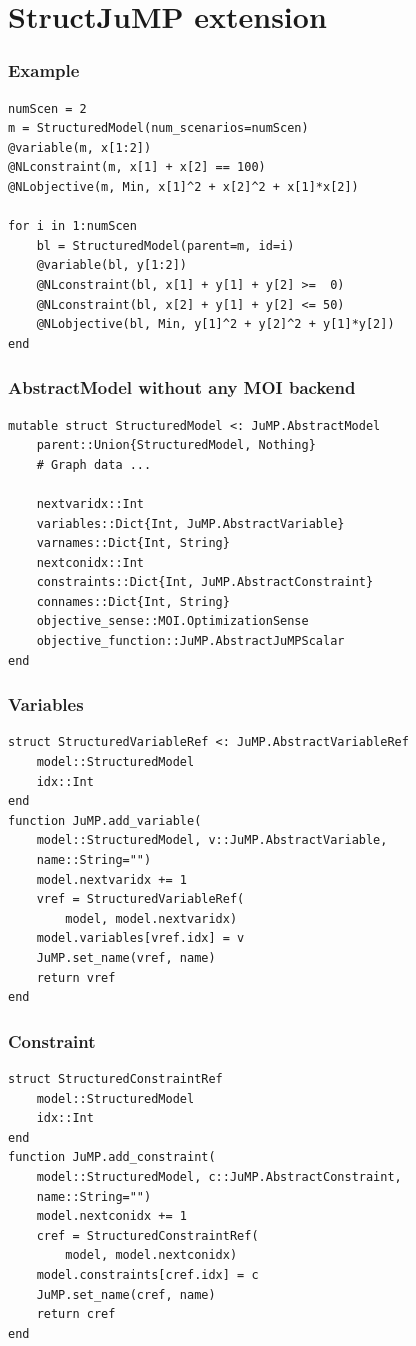 \documentclass{beamer}
\begin{document}
\section{StructJuMP extension}

\begin{frame}[fragile]
  \frametitle{Example}
  \begin{verbatim}
numScen = 2
m = StructuredModel(num_scenarios=numScen)
@variable(m, x[1:2])
@NLconstraint(m, x[1] + x[2] == 100)
@NLobjective(m, Min, x[1]^2 + x[2]^2 + x[1]*x[2])

for i in 1:numScen
    bl = StructuredModel(parent=m, id=i)
    @variable(bl, y[1:2])
    @NLconstraint(bl, x[1] + y[1] + y[2] >=  0)
    @NLconstraint(bl, x[2] + y[1] + y[2] <= 50)
    @NLobjective(bl, Min, y[1]^2 + y[2]^2 + y[1]*y[2])
end
  \end{verbatim}
\end{frame}

\begin{frame}[fragile]
  \frametitle{AbstractModel without any MOI backend}
  \begin{verbatim}
mutable struct StructuredModel <: JuMP.AbstractModel
    parent::Union{StructuredModel, Nothing}
    # Graph data ...

    nextvaridx::Int
    variables::Dict{Int, JuMP.AbstractVariable}
    varnames::Dict{Int, String}
    nextconidx::Int
    constraints::Dict{Int, JuMP.AbstractConstraint}
    connames::Dict{Int, String}
    objective_sense::MOI.OptimizationSense
    objective_function::JuMP.AbstractJuMPScalar
end
  \end{verbatim}
\end{frame}

\begin{frame}[fragile]
  \frametitle{Variables}
  \begin{verbatim}
struct StructuredVariableRef <: JuMP.AbstractVariableRef
    model::StructuredModel
    idx::Int
end
function JuMP.add_variable(
    model::StructuredModel, v::JuMP.AbstractVariable,
    name::String="")
    model.nextvaridx += 1
    vref = StructuredVariableRef(
        model, model.nextvaridx)
    model.variables[vref.idx] = v
    JuMP.set_name(vref, name)
    return vref
end
  \end{verbatim}
\end{frame}

\begin{frame}[fragile]
  \frametitle{Constraint}
  \begin{verbatim}
struct StructuredConstraintRef
    model::StructuredModel
    idx::Int
end
function JuMP.add_constraint(
    model::StructuredModel, c::JuMP.AbstractConstraint,
    name::String="")
    model.nextconidx += 1
    cref = StructuredConstraintRef(
        model, model.nextconidx)
    model.constraints[cref.idx] = c
    JuMP.set_name(cref, name)
    return cref
end
  \end{verbatim}
\end{frame}
\end{document}
